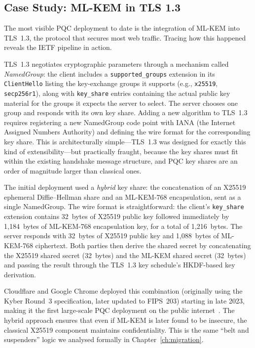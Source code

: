 \subsection{Case Study: ML-KEM in TLS 1.3}
\label{subsec:mlkem-tls}

The most visible PQC deployment to date is the integration of ML-KEM into TLS~1.3, the protocol that secures most web traffic. Tracing how this happened reveals the IETF pipeline in action.

TLS~1.3 negotiates cryptographic parameters through a mechanism called \emph{NamedGroup}: the client includes a \texttt{supported\_groups} extension in its \texttt{ClientHello} listing the key-exchange groups it supports (e.g., \texttt{x25519}, \texttt{secp256r1}), along with \texttt{key\_share} entries containing the actual public key material for the groups it expects the server to select. The server chooses one group and responds with its own key share. Adding a new algorithm to TLS~1.3 requires registering a new NamedGroup code point with IANA (the Internet Assigned Numbers Authority) and defining the wire format for the corresponding key share. This is architecturally simple---TLS~1.3 was designed for exactly this kind of extensibility---but practically fraught, because the key shares must fit within the existing handshake message structure, and PQC key shares are an order of magnitude larger than classical ones.

The initial deployment used a \emph{hybrid} key share: the concatenation of an X25519 ephemeral Diffie--Hellman share and an ML-KEM-768 encapsulation, sent as a single NamedGroup. The wire format is straightforward: the client's \texttt{key\_share} extension contains 32~bytes of X25519 public key followed immediately by 1,184~bytes of ML-KEM-768 encapsulation key, for a total of 1,216~bytes. The server responds with 32~bytes of X25519 public key and 1,088~bytes of ML-KEM-768 ciphertext. Both parties then derive the shared secret by concatenating the X25519 shared secret (32~bytes) and the ML-KEM shared secret (32~bytes) and passing the result through the TLS~1.3 key schedule's HKDF-based key derivation.

Cloudflare and Google Chrome deployed this combination (originally using the Kyber Round~3 specification, later updated to FIPS~203) starting in late 2023, making it the first large-scale PQC deployment on the public internet~\cite{Stebila2020}. The hybrid approach ensures that even if ML-KEM is later found to be insecure, the classical X25519 component maintains confidentiality. This is the same ``belt and suspenders'' logic we analysed formally in Chapter~\ref{ch:migration}.

